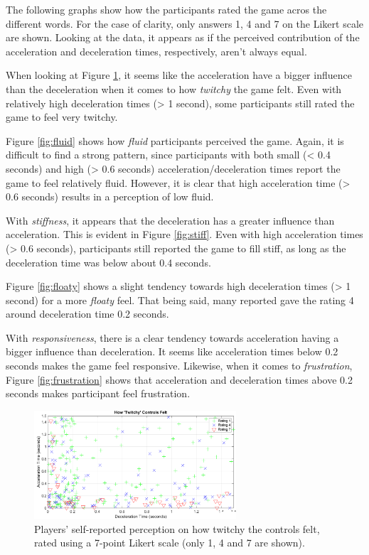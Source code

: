 The following graphs show how the participants rated the game acros the different words. For the case of clarity, only answers 1, 4 and 7 on the Likert scale are shown. Looking at the data, it appears as if the perceived contribution of the acceleration and deceleration times, respectively, aren't always equal.

When looking at Figure \ref{fig:twitchy}, it seems like the acceleration have a bigger influence than the deceleration when it comes to how \textit{twitchy} the game felt. Even with relatively high deceleration times (> 1 second), some participants still rated the game to feel very twitchy.

Figure \ref{fig:fluid} shows how \textit{fluid} participants perceived the game. Again, it is difficult to find a strong pattern, since participants with both small (< 0.4 seconds) and high (> 0.6 seconds) acceleration/deceleration times report the game to feel relatively fluid. However, it is clear that high acceleration time (> 0.6 seconds) results in a perception of low fluid.

With \textit{stiffness}, it appears that the deceleration has a greater influence than acceleration. This is evident in Figure \ref{fig:stiff}. Even with high acceleration times (> 0.6 seconds), participants still reported the game to fill stiff, as long as the deceleration time was below about 0.4 seconds.

Figure \ref{fig:floaty} shows a slight tendency towards high deceleration times (> 1 second) for a more \textit{floaty} feel. That being said, many reported gave the rating 4 around deceleration time 0.2 seconds.

With \textit{responsiveness}, there is a clear tendency towards acceleration having a bigger influence than deceleration. It seems like acceleration times below 0.2 seconds makes the game feel responsive. Likewise, when it comes to \textit{frustration}, Figure \ref{fig:frustration} shows that acceleration and deceleration times above 0.2 seconds makes participant feel frustration.

\begin{figure}[htbp]
\centering
\includegraphics[width=0.67\textwidth]{Pics/Classes/Twitchy_classes}
\caption{Players' self-reported perception on how twitchy the controls felt, rated using a 7-point Likert scale (only 1, 4 and 7 are shown).}
\label{fig:twitchy}
\end{figure}

